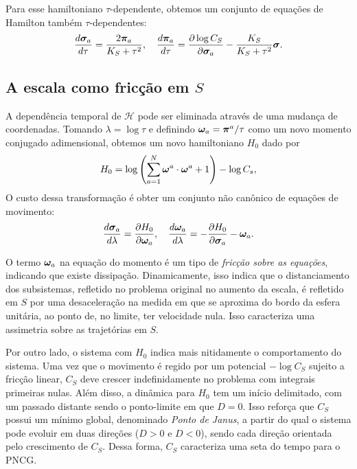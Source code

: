 Para esse hamiltoniano $\tau$-dependente, obtemos um conjunto de equações de Hamilton também $\tau$-dependentes:
\begin{equation}
    \dfrac{d \bm \sigma_a}{d \tau} = \dfrac{2 \bm \pi_a}{K_S + \tau^2},
    \quad
    \dfrac{d \bm \pi_a}{d \tau} = \dfrac{\partial \log C_S}{\partial \bm \sigma_a} - \dfrac{K_S}{K_S + \tau^2} \bm \sigma.
\end{equation}

\subsection{A escala como fricção em $S$}

A dependência temporal de $\mathcal H$ pode ser eliminada através de uma mudança de coordenadas. Tomando $\lambda = \log \tau$ e definindo $\bm \omega_a = \bm \pi^a / \tau$ como um novo momento conjugado adimensional, obtemos um novo hamiltoniano $H_0$ dado por
\begin{equation}
    H_0 = \log\left(\sum_{a=1}^{N} \bm \omega^a \cdot \bm \omega^a + 1\right) - \log C_s,
\end{equation}
O custo dessa transformação é obter um conjunto não canônico de equações de movimento:
\begin{equation}
    \dfrac{d \bm \sigma_a}{d \lambda} = \dfrac{\partial H_0}{\partial \bm \omega_a},
    \quad
    \dfrac{d \bm \omega_a}{d \lambda} = - \dfrac{\partial H_0}{\partial \bm \sigma_a} - \bm \omega_a.
\end{equation}

O termo $\bm \omega_a$ na equação do momento é um tipo de  \textit{fricção sobre as equações}, indicando que existe dissipação. Dinamicamente, isso indica que o distanciamento dos subsistemas, refletido no problema original no aumento da escala, é refletido em $S$ por uma desaceleração na medida em que se aproxima do bordo da esfera unitária, ao ponto de, no limite, ter velocidade nula. Isso caracteriza uma assimetria sobre as trajetórias em $S$.

Por outro lado, o sistema com $H_0$ indica mais nitidamente o comportamento do sistema. Uma vez que o movimento é regido por um potencial $-\log C_S$ sujeito a fricção linear, $C_S$ deve crescer indefinidamente no problema com integrais primeiras nulas. Além disso, a dinâmica para $H_0$ tem um início delimitado, com um passado distante sendo o ponto-limite em que $D=0$. Isso reforça que $C_S$ possui um mínimo global, denominado \textit{Ponto de Janus}, a partir do qual o sistema pode evoluir em duas direções ($D > 0$ e $D < 0$), sendo cada direção orientada pelo crescimento de $C_S$. Dessa forma, $C_S$ caracteriza uma seta do tempo para o PNCG.

